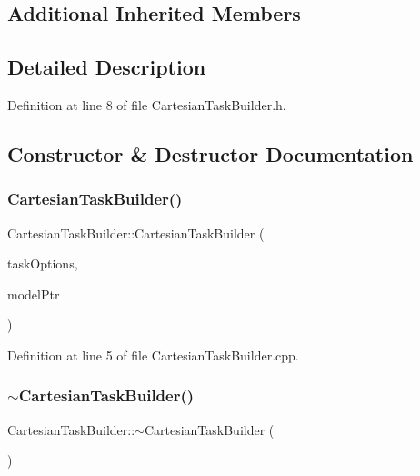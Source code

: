 \subsection*{Additional Inherited Members}


\subsection{Detailed Description}


Definition at line 8 of file Cartesian\+Task\+Builder.\+h.



\subsection{Constructor \& Destructor Documentation}
\hypertarget{classocra_1_1CartesianTaskBuilder_ad78453b86c3777783c94098967426bad}{}\label{classocra_1_1CartesianTaskBuilder_ad78453b86c3777783c94098967426bad} 
\subsubsection{\texorpdfstring{Cartesian\+Task\+Builder()}{CartesianTaskBuilder()}}
{\footnotesize\ttfamily Cartesian\+Task\+Builder\+::\+Cartesian\+Task\+Builder (\begin{DoxyParamCaption}\item[{const \hyperlink{classocra_1_1TaskBuilderOptions}{Task\+Builder\+Options} \&}]{task\+Options,  }\item[{Model\+::\+Ptr}]{model\+Ptr }\end{DoxyParamCaption})}



Definition at line 5 of file Cartesian\+Task\+Builder.\+cpp.

\hypertarget{classocra_1_1CartesianTaskBuilder_aecc30a79dfbeaf935d302a3f1e2c3fac}{}\label{classocra_1_1CartesianTaskBuilder_aecc30a79dfbeaf935d302a3f1e2c3fac} 
\subsubsection{\texorpdfstring{$\sim$\+Cartesian\+Task\+Builder()}{~CartesianTaskBuilder()}}
{\footnotesize\ttfamily Cartesian\+Task\+Builder\+::$\sim$\+Cartesian\+Task\+Builder (\begin{DoxyParamCaption}{ }\end{DoxyParamCaption})\hspace{0.3cm}{\ttfamily [virtual]}}




